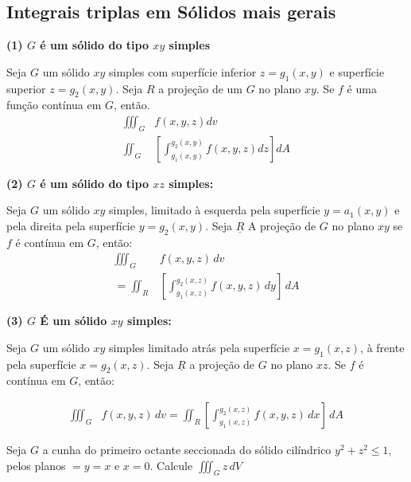 \documentclass[portugues, 11pt]{article}
\begin{document}
	\subsection{Integrais triplas em Sólidos mais gerais}
	
	\textbf{(1) $G$ é um sólido do tipo $xy$ simples}
	\begin{thrm}
		Seja $G$ um sólido $xy$ simples com superfície inferior $z=g_1(x,y)$ e superfície superior $z=g_2(x,y)$. Seja $R$ a projeção de um $G$ no plano $xy$. Se $f$ é uma função contínua em $G$, então.
		\begin{align*}
		\iiint_G & {f(x,y,z)}{dv}
		\\
		\iint_G  & [\int_{g_1 (x,y)}^{g_2 (x,y)} {f(x,y,z)}{dz} ] {dA}
		\end{align*}
	\end{thrm}
	
	\textbf{(2) $G$ é um sólido do tipo $xz$ simples: }
	\begin{thrm}
		Seja $G$ um sólido $xy$ simples, limitado à esquerda pela superfície $y=a_1 (x,y)$ e pela direita pela superfície $y=g_2 (x,y)$. Seja $\underline{R}$ A projeção de $G$ no plano $xy$ se $f$ é contínua em $G$, então: 
		\begin{align*}
			\iiint_G & {f(x,y,z)} \,dv \\
			= \iint_R & \left[ \int_{g_1(x,z)}^{g_2(x,z)}	f(x,y,z) \,dy \right ] \,dA 
		\end{align*}
	\end{thrm}


	\textbf{(3) $G$ É um sólido $xy$ simples:}
	\begin{thrm}
		Seja $G$ um sólido $xy$ simples limitado atrás pela superfície $x=g_1(x,z)$, à frente pela superfície $x=g_2(x,z)$.
		Seja $\underline{R}$ a projeção de $G$ no plano $xz$. Se $f$ é contínua em $G$, então:
		
		\begin{align*}
			\iiint_G & f(x,y,z) \,dv
			= \iint_R \left [ \int_{g_1(x,z)}^{g_2(x,z)} f(x,y,z) \,dx \right ] \,dA
		\end{align*}
	\end{thrm}
	
	\begin{exmp}
		Seja $G$ a cunha do primeiro octante seccionada do sólido cilíndrico $y^2+z^2 \leq 1$, pelos planos $=y=x$ e $x=0$.
		Calcule $\iiint_G z \,dV$
	\end{exmp}



	
	
	

	
  
\end{document}

